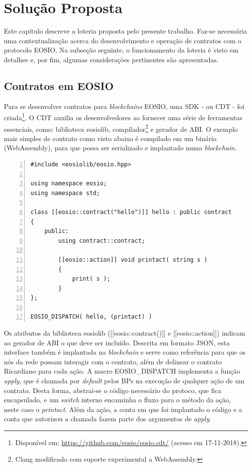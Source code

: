 \documentclass[a4paper,12pt]{monografia}
\theoremstyle{plain}
\theoremstyle{definition}
\theoremstyle{remark}
\begin{document}
\chapter{Solu\c{c}\~{a}o Proposta}

Este cap\'itulo descreve a loteria proposta pelo presente trabalho.
Faz-se necess\'aria uma contextualiza\c{c}\~ao acerca do desenvolvimento e opera\c{c}\~ao de contratos com o protocolo EOSIO.
Na subse\c{c}\~ao seguinte, o funcionamento da loteria \'e visto em detalhes e, por fim, algumas considera\c{c}\~oes pertinentes s\~ao apresentadas.

\section{Contratos em EOSIO}

Para se desenvolver contratos para \textit{blockchains} EOSIO, uma SDK - ou CDT - foi criada\footnote{Dispon\'ivel em: \url{https://github.com/eosio/eosio.cdt/} (acesso em 17-11-2018).}.
O CDT auxilia os desenvolvedores ao fornecer uma s\'erie de ferramentas essenciais, como: biblioteca eosiolib, compilador\footnote{Clang modificado com suporte experimental a WebAssembly.} e gerador de ABI.
O exemplo mais simples de contrato como visto abaixo \'e compilado em um bin\'ario (WebAssembly), para que possa ser serializado e implantado numa \textit{blockchain}.

\lstset{tabsize=5,language=C++,showstringspaces=false,basicstyle=\ttfamily\small,keywordstyle=\bf,breaklines=true}
\begin{singlespacing}
\begin{lstlisting}[frame=single,framexrightmargin=1pt,numbers=left]
#include <eosiolib/eosio.hpp>

using namespace eosio;
using namespace std;

class [[eosio::contract("hello")]] hello : public contract
{
    public:
        using contract::contract;

        [[eosio::action]] void printact( string s )
        {
            print( s );
        }
};

EOSIO_DISPATCH( hello, (printact) )
\end{lstlisting}
\end{singlespacing}

Os atributos da biblioteca eosiolib ([[eosio::contract()]] e [[eosio::action]]) indicam ao gerador de ABI o que deve ser inclu\'ido.
Descrita em formato JSON, esta interface tamb\'em \'e implantada na \textit{blockchain} e serve como refer\^encia para que os n\'os da rede possam interagir com o contrato, al\'em de delinear o contrato Ricardiano para cada a\c{c}\~ao.
A macro EOSIO\_DISPATCH implementa a fun\c{c}\~ao \textit{apply}, que \'e chamada por \textit{default} pelos BPs na execu\c{c}\~ao de qualquer a\c{c}\~ao de um contrato.
Desta forma, abstrai-se o c\'odigo necess\'ario do protoco, que fica encapsulado, e um \textit{switch} interno encaminha o fluxo para o m\'etodo da a\c{c}\~ao, neste caso o \textit{printact}.
Al\'em da a\c{c}\~ao, a conta em que foi implantado o c\'odigo e a conta que autorizou a chamada fazem parte dos argumentos de \textit{apply}.
\end{document}
